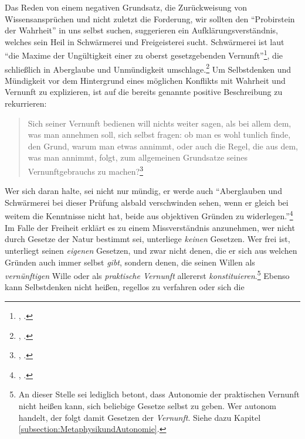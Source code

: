 Das Reden von einem  negativen Grundsatz, die Zurückweisung von Wissensansprüchen
und nicht zuletzt die Forderung, wir sollten den \enquote{Probirstein der
Wahrheit} in uns selbst suchen, suggerieren ein Aufklärungsverständnis,
welches sein Heil in Schwärmerei und Freigeisterei sucht. Schwärmerei ist laut
 \enquote{die Maxime der Ungültigkeit einer zu oberst
gesetzgebenden
Vernunft}\footnote{\cite[][A~327]{Kant:Washeisst:SichimDenkenorientieren?1977},
\cite[VIII: 145.25--26]{Kant:GesammelteWerke1900ff.}.}, die schließlich in
Aberglaube und Unmündigkeit
umschlage.\footnote{\cite[Vgl.][A~327]{Kant:Washeisst:SichimDenkenorientieren?1977},
\cite[][VIII: 145.27--35]{Kant:GesammelteWerke1900ff.}.} Um Selbstdenken und
Mündigkeit vor dem Hintergrund eines möglichen Konflikts mit Wahrheit und
Vernunft zu explizieren, ist auf die bereits genannte positive Beschreibung zu
rekurrieren:
\begin{quote}
  Sich seiner  Vernunft bedienen will nichts weiter sagen, als bei
  allem dem, was man annehmen soll, sich selbst fragen: ob man es wohl tunlich
  finde, den Grund, warum man etwas annimmt, oder auch die Regel, die aus dem,
  was man annimmt, folgt, zum allgemeinen Grundsatze seines Vernunftgebrauchs zu
  machen?\footnote{\cite[A~329]{Kant:Washeisst:SichimDenkenorientieren?1977},
  \cite[VIII: 146.35--147.6]{Kant:GesammelteWerke1900ff.}.}
\end{quote}\enlargethispage{\baselineskip}
Wer sich daran halte, sei
nicht nur mündig, er werde auch \enquote{Aberglauben und Schwärmerei bei dieser
Prüfung alsbald verschwinden sehen, wenn er gleich bei weitem die Kenntnisse
nicht hat, beide aus objektiven Gründen zu
widerlegen.}\footnote{\cite[A~329]{Kant:Washeisst:SichimDenkenorientieren?1977},
  \cite[VIII: 147.6--9]{Kant:GesammelteWerke1900ff.}.} Im Falle der Freiheit
erklärt  es zu einem Missverständnis anzunehmen, wer nicht durch
Gesetze der Natur bestimmt sei, unterliege \emph{keinen} Gesetzen. Wer frei ist,
unterliegt seinen \emph{eigenen} Gesetzen, und zwar nicht denen, die er sich aus
welchen Gründen auch immer selbst \emph{gibt}, sondern denen, die seinen
Willen als \emph{vernünftigen} Wille oder als \emph{praktische Vernunft}
allererst \emph{konstituieren}.\footnote{An dieser Stelle sei lediglich betont,
dass Autonomie der praktischen Vernunft nicht heißen kann, sich beliebige
Gesetze selbst zu geben. Wer autonom handelt, der folgt damit Gesetzen der
\emph{Vernunft}. Siehe dazu Kapitel \ref{subsection:MetaphysikundAutonomie}.}
Ebenso kann Selbstdenken nicht heißen, regellos zu verfahren oder sich die
